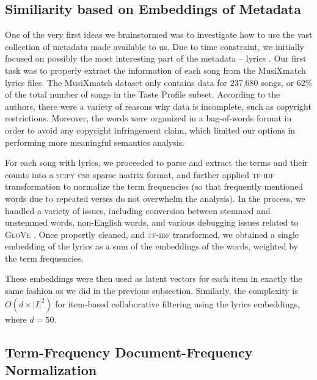 \documentclass[conference]{IEEEtran}
\begin{document}
\subsection{Similiarity based on Embeddings of Metadata}

One of the very first ideas we brainstormed was
to investigate how to use the vast collection of metadata made
available to us. Due to time constraint, we initially focused on possibly the
most interesting part of the metadata -- lyrics
\cite{Bertin-Mahieux2011}.
Our first task was to properly extract the information of each song from the
MusiXmatch lyrics files. The
MusiXmatch dataset only contains data for 237,680 songs, or 62\% of the total
number of songs in the Taste Profile subset. According to the authors,
there were a variety of reasons why data is incomplete, such as
copyright restrictions. Moreover, the words were organized in a
bag-of-words format in order to avoid any copyright infringement claim,
which limited our options in performing more meaningful semantics analysis.

For each song with lyrics, we proceeded to parse and extract the terms
and their counts into a \textsc{scipy csr} sparse matrix format,
and further applied \textsc{tf-idf} \cite{sparck1972statistical} 
transformation to
normalize the term frequencies (so that frequently
mentioned words due to repeated verses do not overwhelm the analysis).
In the process, we handled a variety of issues,
including conversion between stemmed and unstemmed words, non-English
words, and various debugging issues related to \textsc{GloVe}
\cite{pennington2014glove}. Once propertly cleaned,
and \textsc{tf-idf} transformed, we obtained a single embedding of the lyrics
as a sum of the embeddings of the words, weighted by the term frequencies.

These embeddings were then used as latent vectors for each item in exactly
the same fashion as we did in the previous subsection. Similarly, the
complexity is $O(d\times |I|^2)$ for item-based collaborative filtering
using the lyrics embeddings, where $d = 50$.

\subsection{Term-Frequency Document-Frequency Normalization}
\end{document}
